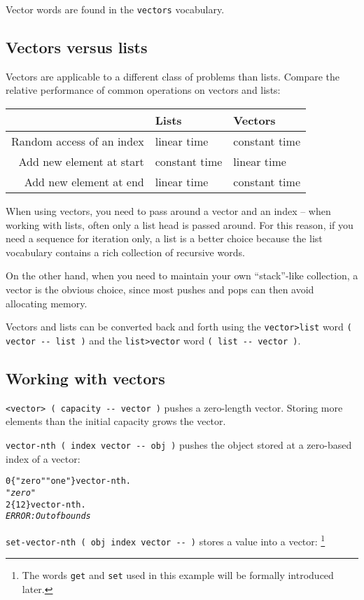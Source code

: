 \documentclass[english]{article}
\providecommand{\tabularnewline}{\\}
\begin{document}
Vector words are found in the \texttt{vectors} vocabulary.

\subsection{Vectors versus lists}

Vectors are applicable to a different class of problems than lists.
Compare the relative performance of common operations on vectors and
lists:

\begin{tabular}{|r|l|l|}
\hline 
&
Lists&
Vectors\tabularnewline
\hline
\hline 
Random access of an index&
linear time&
constant time\tabularnewline
\hline 
Add new element at start&
constant time&
linear time\tabularnewline
\hline 
Add new element at end&
linear time&
constant time\tabularnewline
\hline
\end{tabular}

When using vectors, you need to pass around a vector and an index
-- when working with lists, often only a list head is passed around.
For this reason, if you need a sequence for iteration only, a list
is a better choice because the list vocabulary contains a rich collection
of recursive words.

On the other hand, when you need to maintain your own {}``stack''-like
collection, a vector is the obvious choice, since most pushes and
pops can then avoid allocating memory.

Vectors and lists can be converted back and forth using the \texttt{vector>list}
word \texttt{( vector -{}- list )} and the \texttt{list>vector} word
\texttt{( list -{}- vector )}.


\subsection{Working with vectors}

\texttt{<vector> ( capacity -{}- vector )} pushes a zero-length vector.
Storing more elements than the initial capacity grows the vector.

\texttt{vector-nth ( index vector -{}- obj )} pushes the object stored
at a zero-based index of a vector:

\begin{alltt}
0 \{ "zero" "one" \} vector-nth .
\emph{"zero"}
2 \{ 1 2 \} vector-nth .
\emph{ERROR: Out of bounds}
\end{alltt}
\texttt{set-vector-nth ( obj index vector -{}- )} stores a value into
a vector:%
\footnote{The words \texttt{get} and \texttt{set} used in this example will
be formally introduced later.%
}
\end{document}

